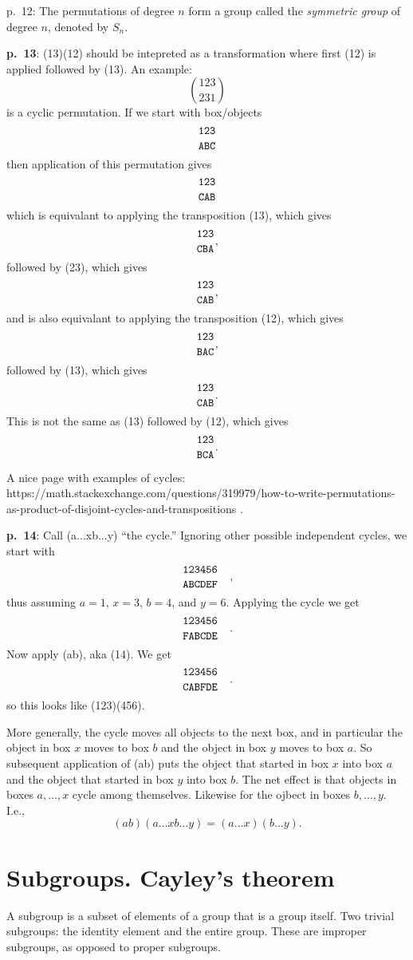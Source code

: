 \documentclass{book}
\begin{document}
p.\ 12: The permutations of degree $n$ form a group called the {\it symmetric group} of degree $n$, denoted by $S_n$.

{\bf p.\ 13}: (13)(12) should be intepreted as a transformation where
first (12) is applied followed by (13). An example:
$$
\genfrac(){0pt}0{123}{231}
$$
is a cyclic permutation. If we start with box/objects
$$
\genfrac{}{}{0pt}0{\tt 123}{\tt ABC}
$$
then application of this permutation gives
$$
\genfrac{}{}{0pt}0{\tt 123}{\tt CAB}
$$
which is equivalant to applying the transposition (13), which gives
$$
\genfrac{}{}{0pt}0{\tt 123}{\tt CBA},
$$
followed by (23), which gives
$$
\genfrac{}{}{0pt}0{\tt 123}{\tt CAB},
$$
and is also equivalant to applying the transposition (12), which gives
$$
\genfrac{}{}{0pt}0{\tt 123}{\tt BAC},
$$
followed by (13), which gives
$$
\genfrac{}{}{0pt}0{\tt 123}{\tt CAB}.
$$
This is not the same as (13) followed by (12), which gives
$$
\genfrac{}{}{0pt}0{\tt 123}{\tt BCA}.
$$

A nice page with examples of cycles:
https://math.stackexchange.com/questions/319979/how-to-write-permutations-as-product-of-disjoint-cycles-and-transpositions
.

{\bf p.\ 14}: Call (a...xb...y) ``the cycle.'' Ignoring other possible
independent cycles, we start with
$$
\genfrac{}{}{0pt}0{\tt 123456}{\tt ABCDEF}\quad,
$$
thus assuming $a=1$, $x=3$, $b=4$, and $y=6$. Applying the cycle we get
$$
\genfrac{}{}{0pt}0{\tt 123456}{\tt FABCDE}\quad.
$$
Now apply (ab), aka (14). We get
$$
\genfrac{}{}{0pt}0{\tt 123456}{\tt CABFDE}\quad.
$$
so this looks like (123)(456).

More generally, the cycle moves all objects to the next box, and in
particular the object in box $x$ moves to box $b$ and the object in
box $y$ moves to box $a$. So subsequent application of (ab) puts the
object that started in box $x$ into box $a$ and the object that
started in box $y$ into box $b$. The net effect is that objects in
boxes $a,...,x$ cycle among themselves. Likewise for the ojbect in
boxes $b,...,y$. I.e.,
$$
(ab)(a...xb...y) = (a...x)(b...y).
$$

\section{Subgroups. Cayley's theorem}

A subgroup is a subset of elements of a group that is a group
itself. Two trivial subgroups: the identity element and the entire
group. These are improper subgroups, as opposed to proper subgroups.
\end{document}
